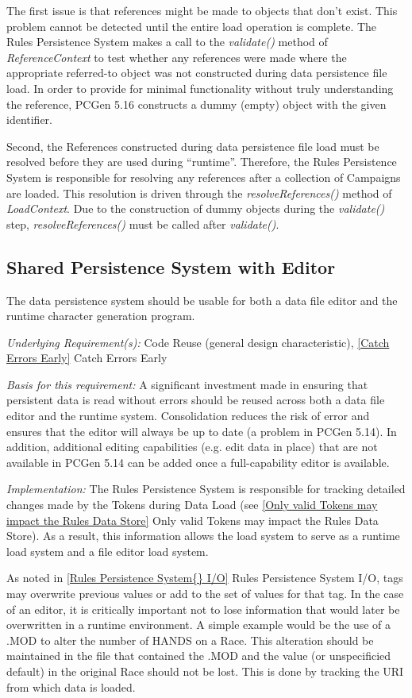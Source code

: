 \documentclass[12pt,letterpaper]{article}
\newcommand{\pcgenversEOS}{5.16}
\newcommand{\systemEOS}{Rules Persistence System}
\newcommand{\system}{\systemEOS{} }
\newcommand{\pcgenvers}{\pcgenversEOS{} }
\newcommand{\textem}[1]{\emph{#1}}
\newcommand{\lsubsection}[1]{\label{#1}\subsection{#1}}
\newcommand{\myref}[1]{\ref{#1} #1}
\newcommand{\basis}{\noindent\textem{Basis for this requirement:} }
\newcommand{\impl}{\noindent\textem{Implementation:} }
\newcommand{\under}{\noindent\textem{Underlying Requirement(s):} }
\begin{document}
The first issue is that references might be made to objects that don't exist.  This problem 
cannot be detected until the entire load operation is complete.  The \system makes a call to
the \textem{validate()} method of \textem{ReferenceContext} to test whether any references were
made where the appropriate referred-to object was not constructed during data persistence file load.
In order to provide for minimal functionality without truly understanding the reference, PCGen 
\pcgenvers constructs a dummy (empty) object with the given identifier.

Second, the References constructed during data persistence file load
must be resolved before they are used during ``runtime''.  Therefore, the
\system is responsible for resolving any references after a collection of Campaigns are loaded.
This resolution is driven through the \textem{resolveReferences()} method of \textem{LoadContext}.
Due to the construction of dummy objects during the \textem{validate()} step,
\textem{resolveReferences()} must be called after \textem{validate()}.

\lsubsection{Shared Persistence System with Editor}

The data persistence system should be usable for both a data file editor and the
runtime character generation program.

\under Code Reuse (general design characteristic), \myref{Catch Errors Early}

\basis A significant investment made in ensuring that persistent data is read
without errors should be reused across both a data file editor and the runtime
system.  Consolidation reduces the risk of error and ensures that the editor
will always be up to date (a problem in PCGen 5.14).  In addition, additional
editing capabilities (e.g. edit data in place) that are not available in PCGen
5.14 can be added once a full-capability editor is available.

\impl The \system is responsible for tracking detailed changes made by the Tokens during 
Data Load (see \myref{Only valid Tokens may impact the Rules Data Store}).  As a result,
this information allows the load system to serve as a runtime load system and a 
file editor load system.

As noted in \myref{\system I/O}, tags may overwrite previous values
or add to the set of values for that tag.  In the case of an editor,
it is critically important not to lose information that
would later be overwritten in a runtime environment.  A simple example would be 
the use of a .MOD to alter the number of HANDS on a Race.  This alteration should
be maintained in the file that contained the .MOD and the value (or unspecificied
default) in the original Race should not be lost.  This is done by tracking the
URI from which data is loaded.
\end{document}

